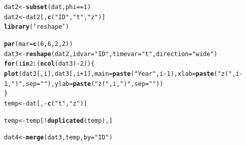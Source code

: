 \documentclass{article}\usepackage[]{graphicx}\usepackage[]{color}
\makeatletter
\newcommand{\hlnum}[1]{\textcolor[rgb]{0.686,0.059,0.569}{#1}}%
\newcommand{\hlstr}[1]{\textcolor[rgb]{0.192,0.494,0.8}{#1}}%
\newcommand{\hlopt}[1]{\textcolor[rgb]{0,0,0}{#1}}%
\newcommand{\hlstd}[1]{\textcolor[rgb]{0.345,0.345,0.345}{#1}}%
\newcommand{\hlkwa}[1]{\textcolor[rgb]{0.161,0.373,0.58}{\textbf{#1}}}%
\newcommand{\hlkwb}[1]{\textcolor[rgb]{0.69,0.353,0.396}{#1}}%
\newcommand{\hlkwc}[1]{\textcolor[rgb]{0.333,0.667,0.333}{#1}}%
\newcommand{\hlkwd}[1]{\textcolor[rgb]{0.737,0.353,0.396}{\textbf{#1}}}%
\newenvironment{kframe}{%
 \def\at@end@of@kframe{}%
 \ifinner\ifhmode%
  \def\at@end@of@kframe{\end{minipage}}%
  \begin{minipage}{\columnwidth}%
 \fi\fi%
 \def\FrameCommand##1{\hskip\@totalleftmargin \hskip-\fboxsep
 \colorbox{shadecolor}{##1}\hskip-\fboxsep
     \hskip-\linewidth \hskip-\@totalleftmargin \hskip\columnwidth}%
 \MakeFramed {\advance\hsize-\width
   \@totalleftmargin\z@ \linewidth\hsize
   \@setminipage}}%
 {\par\unskip\endMakeFramed%
 \at@end@of@kframe}
\newenvironment{knitrout}{}{} %
\makeatother
\begin{document}
\begin{knitrout}
\color{fgcolor}\begin{kframe}
\begin{alltt}
\hlstd{dat2}\hlkwb{<-}\hlkwd{subset}\hlstd{(dat,phi}\hlopt{==}\hlnum{1}\hlstd{)}
\hlstd{dat2}\hlkwb{<-}\hlstd{dat2[,}\hlkwd{c}\hlstd{(}\hlstr{"ID"}\hlstd{,}\hlstr{"t"}\hlstd{,}\hlstr{"z"}\hlstd{)]}
\hlkwd{library}\hlstd{(}\hlstr{'reshape'}\hlstd{)}
\end{alltt}


{\ttfamily\noindent\itshape\color{messagecolor}{\#\# Loading required package: plyr\\\#\# \\\#\# Attaching package: 'reshape'\\\#\# \\\#\# The following objects are masked from 'package:plyr':\\\#\# \\\#\#\ \ \ \  rename, round\_any}}\begin{alltt}
\hlkwd{par}\hlstd{(}\hlkwc{mar}\hlstd{=}\hlkwd{c}\hlstd{(}\hlnum{6}\hlstd{,}\hlnum{6}\hlstd{,}\hlnum{2}\hlstd{,}\hlnum{2}\hlstd{))}
\hlstd{dat3}\hlkwb{<-}\hlkwd{reshape}\hlstd{(dat2,} \hlkwc{idvar} \hlstd{=} \hlstr{"ID"}\hlstd{,} \hlkwc{timevar} \hlstd{=} \hlstr{"t"}\hlstd{,} \hlkwc{direction} \hlstd{=} \hlstr{"wide"}\hlstd{)}
\hlkwa{for}\hlstd{(i} \hlkwa{in} \hlnum{2}\hlopt{:}\hlstd{(}\hlkwd{ncol}\hlstd{(dat3)}\hlopt{-}\hlnum{2}\hlstd{))\{}
  \hlkwd{plot}\hlstd{(dat3[,i],dat3[,i}\hlopt{+}\hlnum{1}\hlstd{],}\hlkwc{main}\hlstd{=}\hlkwd{paste}\hlstd{(}\hlstr{"Year"}\hlstd{,i}\hlopt{-}\hlnum{1}\hlstd{),}\hlkwc{xlab}\hlstd{=}\hlkwd{paste}\hlstd{(}\hlstr{"z("}\hlstd{,i}\hlopt{-}\hlnum{1}\hlstd{,}\hlstr{")"}\hlstd{,}\hlkwc{sep}\hlstd{=}\hlstr{""}\hlstd{),}\hlkwc{ylab}\hlstd{=}\hlkwd{paste}\hlstd{(}\hlstr{"z("}\hlstd{,i,}\hlstr{")"}\hlstd{,}\hlkwc{sep}\hlstd{=}\hlstr{""}\hlstd{))}
\hlstd{\}}
\hlstd{temp}\hlkwb{<-}\hlstd{dat[,}\hlopt{-}\hlkwd{c}\hlstd{(}\hlstr{"t"}\hlstd{,}\hlstr{"z"}\hlstd{)]}
\end{alltt}


{\ttfamily\noindent\bfseries\color{errorcolor}{\#\# Error: invalid argument to unary operator}}\begin{alltt}
\hlstd{temp}\hlkwb{<-}\hlstd{temp[}\hlopt{!}\hlkwd{duplicated}\hlstd{(temp),]}
\end{alltt}


{\ttfamily\noindent\bfseries\color{errorcolor}{\#\# Error: object 'temp' not found}}\begin{alltt}
\hlstd{dat4}\hlkwb{<-}\hlkwd{merge}\hlstd{(dat3,temp,}\hlkwc{by}\hlstd{=}\hlstr{"ID"}\hlstd{)}
\end{alltt}



\end{kframe}
\end{knitrout}
\end{document}
